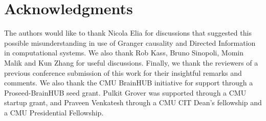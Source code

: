 \documentclass[letterpaper, 10pt, conference]{ieeeconf}
\begin{document}



\section*{Acknowledgments}

The authors would like to thank Nicola Elia for discussions that suggested this possible misunderstanding in use of Granger causality and Directed Information in computational systems. We also thank Rob Kass, Bruno Sinopoli, Momin Malik and Kun Zhang for useful discussions. Finally, we thank the reviewers of a previous conference submission of this work for their insightful remarks and comments. We also thank the CMU BrainHUB initiative for support through a Proseed-BrainHUB seed grant. Pulkit Grover was supported through a CMU startup grant, and Praveen Venkatesh through a CMU CIT Dean's fellowship and a CMU Presidential Fellowship.




\newpage
\end{document}
